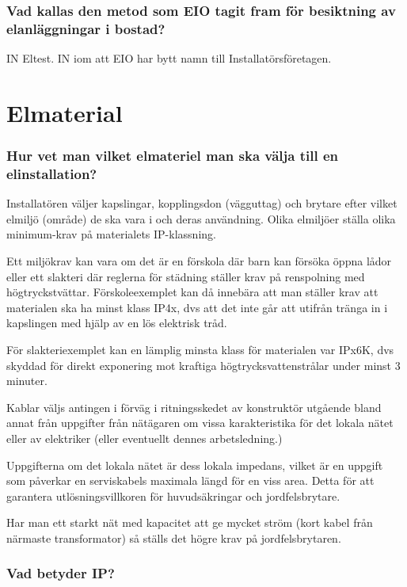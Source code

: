 \documentclass[a4paper,swedish]{article}
\begin{document}
\setcounter{section}{68}
\section{Vad kallas den metod som EIO tagit fram för besiktning av elanläggningar i bostad?}

IN Eltest. IN iom att EIO har bytt namn till Installatörsföretagen.

\part{Elmaterial}

\setcounter{section}{0}
\section{Hur vet man vilket elmateriel man ska välja till en elinstallation?}

Installatören väljer kapslingar, kopplingsdon (vägguttag) och brytare efter vilket elmiljö (område)
de ska vara i och deras användning. Olika elmiljöer ställa olika minimum-krav på materialets IP-klassning.

Ett miljökrav kan vara om det är en förskola där barn kan försöka öppna lådor eller ett slakteri där
reglerna för städning ställer krav på renspolning med högtryckstvättar. Förskoleexemplet kan då innebära att
man ställer krav att materialen ska ha minst klass IP4x, dvs att det inte går att utifrån tränga in i
kapslingen med hjälp av en lös elektrisk tråd.

För slakteriexemplet kan en lämplig minsta klass för materialen var IPx6K, dvs skyddad för direkt
exponering mot kraftiga högtrycksvattenstrålar under minst 3 minuter.

Kablar väljs antingen i förväg i ritningsskedet av konstruktör utgående bland annat från
uppgifter från nätägaren om vissa karakteristika för det lokala nätet eller av
elektriker (eller eventuellt dennes arbetsledning.)

Uppgifterna om det lokala nätet är dess lokala impedans, vilket är en uppgift som
påverkar en serviskabels maximala längd för en viss area.
Detta för att garantera utlösningsvillkoren för huvudsäkringar och jordfelsbrytare.

Har man ett starkt nät med kapacitet att ge mycket ström (kort kabel från närmaste transformator)
så ställs det högre krav på jordfelsbrytaren.

\setcounter{section}{2}
\section{Vad betyder IP?}
\end{document}
